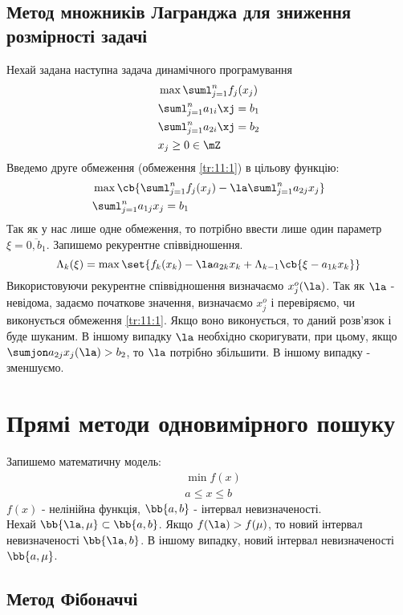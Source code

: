 \subsection{Метод множників Лагранджа для зниження розмірності задачі}
Нехай задана наступна задача динамічного програмування 
\begin{eqnarray}
	&\max \suml_{j=1}^n f_j(x_j)\\
	&\suml_{j=1}^n a_{1i} \xj = b_1 \\
	&\suml_{j=1}^n a_{2i} \xj = b_2 \label{tr:11:1}\\
	&x_j \geq 0 \in \mZ
\end{eqnarray}
Введемо друге обмеження (обмеження \eqref{tr:11:1}) в цільову функцію:
\begin{eqnarray}
	&\max \cb{\suml_{j=1}^n f_j(x_j) - \la \suml_{j=1}^n a_{2j} x_j}\\
	&\suml_{j=1}^n a_{1j} x_j = b_1
\end{eqnarray}
Так як у нас лише одне обмеження, то потрібно ввести лише один параметр $\xi = \overline{0,b_1}$. Запишемо рекурентне співвідношення.
\begin{equation}
	\Lambda_k(\xi) = \max \set{f_k(x_k) - \la a_{2k} x_k + \Lambda_{k-1}\cb{\xi - a_{1k} x_k}}
\end{equation}
Використовуючи рекурентне співвідношення визначаємо $x_j^o(\la)$. Так як $\la$ - невідома, задаємо початкове значення, визначаємо $x_j^o$ і перевіряємо, чи виконується обмеження \eqref{tr:11:1}. Якщо воно виконується, то даний розв’язок і буде шуканим. В іншому випадку $\la$ необхідно скоригувати, при цьому, якщо $\sumjon a_{2j}x_j(\la)>b_2$, то $\la$ потрібно збільшити. В іншому випадку - зменшуємо.
\section{Прямі методи одновимірного пошуку}
Запишемо математичну модель:
\begin{eqnarray}
	&\min f(x) \\
	&a\leq x \leq b 
\end{eqnarray}
$f(x)$ - нелінійна функція, $\bb{a,b}$ - інтервал невизначеності.\\
Нехай $\bb{\la,\mu}\subset\bb{a,b}$. Якщо $f(\la)>f(\mu)$, то новий інтервал невизначеності $\bb{\la,b}$. В іншому випадку, новий інтервал невизначеності $\bb{a,\mu}$.
\subsection{Метод Фібоначчі}
